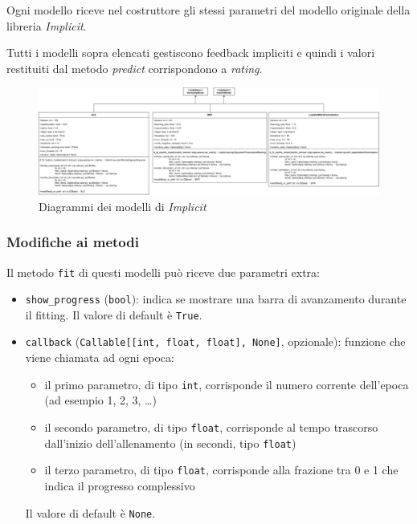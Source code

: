 Ogni modello riceve nel costruttore gli stessi parametri del modello originale della libreria \textit{Implicit}.

Tutti i modelli sopra elencati gestiscono feedback impliciti e quindi i valori restituiti dal metodo \textit{predict} corrispondono a \textit{rating}.

\begin{figure}[H]
    \centering
    \includegraphics[angle=90, scale=0.1]{figures/UML/models/implicit_similarity_models.png}
    \caption{Diagrammi dei modelli di \textit{Implicit}}
\end{figure}

\subsubsection{Modifiche ai metodi}

Il metodo \texttt{fit} di questi modelli può riceve due parametri extra:

\begin{itemize}
    \item \texttt{show\_progress} (\texttt{bool}): indica se mostrare una barra di avanzamento durante il fitting. Il valore di default è \texttt{True}.
    \item \texttt{callback} (\texttt{Callable[[int, float, float], None]}, opzionale): funzione che viene chiamata ad ogni epoca:
    \begin{itemize}
        \item il primo parametro, di tipo \texttt{int}, corrisponde il numero corrente dell'epoca (ad esempio 1, 2, 3, \ldots)
        \item il secondo parametro, di tipo \texttt{float}, corrisponde al tempo trascorso dall'inizio dell'allenamento (in secondi, tipo \texttt{float})
        \item il terzo parametro, di tipo \texttt{float}, corrisponde alla frazione tra 0 e 1 che indica il progresso complessivo
    \end{itemize}
    Il valore di default è \texttt{None}.
\end{itemize}

